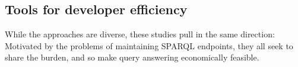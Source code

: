 \subsection{Tools for developer efficiency}


While the approaches are diverse, these studies pull in the same
direction: Motivated by the problems of maintaining SPARQL endpoints,
they all seek to share the burden, and so make query answering
economically feasible.




